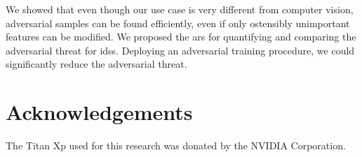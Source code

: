 \documentclass[conference]{IEEEtran}
\begin{document}
We showed that even though our use case is very different from computer vision, adversarial samples can be found efficiently, even if only ostensibly unimportant features can be modified. We proposed the \gls{ars} for quantifying and comparing the adversarial threat for \glspl{ids}.
Deploying an adversarial training procedure, we could significantly reduce the adversarial threat.

\section*{Acknowledgements}
The Titan Xp used for this research was donated by the NVIDIA Corporation.


\renewcommand*{\bibfont}{\small}


\end{document}
